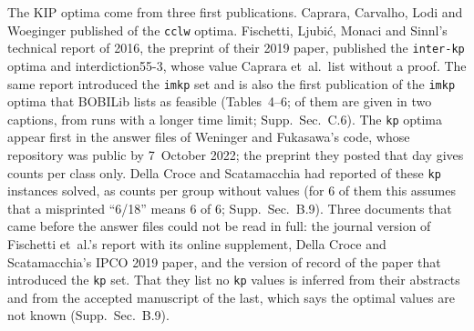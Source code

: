 \documentclass[]{spie}  %
\theoremstyle{plain}
\newcommand{\supp}[1]{Supp.\ Sec.~#1}
\newcommand{\code}[1]{\texttt{#1}}
\newcommand{\inst}[1]{\mbox{#1}}             %
\begin{document}
The \NumLitKip{} KIP optima come from three first publications. Caprara, Carvalho, Lodi and Woeginger
published \NumLitCaprara{} of the \code{cclw} optima.\cite{caprara2016bilevel} Fischetti,
Ljubi\'c, Monaci and Sinnl's technical report of 2016, the preprint of their 2019 paper, published
the \NumLitFischettiSixteenInterKp{} \code{inter-kp} optima and \inst{interdiction55-3}, whose
value Caprara et~al.\ list without a proof.\cite{fischetti2016monotonicity,fischetti2019interdiction}
The same report introduced the \code{imkp} set and is also the first publication of the
\NumLitImkp{} \code{imkp} optima that BOBILib lists as feasible (Tables~4--6; \NumLitImkpCaption{} of them are given in two captions, from runs with
a longer time limit; \supp{C.6}). The \NumLitWeningerFukasawa{} \code{kp} optima appear first in
the answer files of Weninger and Fukasawa's code, whose repository was public by 7~October
2022;\cite{weninger_bkpsolver} the preprint they posted that day gives counts per class
only.\cite{weninger2022fast} Della Croce and Scatamacchia had reported
\NumLitKipProvedEarlier{} of these \code{kp} instances solved, as counts per group without values
(for 6 of them this assumes that a misprinted ``6/18'' means 6 of 6; \supp{B.9}).\cite{dellacroce2020exact} Three documents that came before the answer files could
not be read in full: the journal version of Fischetti et~al.'s report with its online supplement,
Della Croce and Scatamacchia's IPCO 2019 paper, and the version of record of the paper that
introduced the \code{kp} set.\cite{fischetti2019interdiction,dellacroce2019lower,fischetti2018dynamic}
That they list no \code{kp} values is inferred from their abstracts and from the accepted
manuscript of the last, which says the optimal values are not known (\supp{B.9}).
\end{document}
